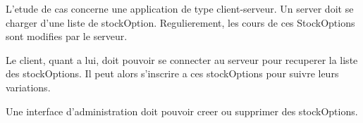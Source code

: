 L'etude de cas concerne une application de type client-serveur. Un server doit se charger d'une liste de stockOption. Regulierement, les cours de ces StockOptions sont modifies par le serveur. 

Le client, quant a lui, doit pouvoir se connecter au serveur pour recuperer la liste des stockOptions. Il peut alors s'inscrire a ces stockOptions pour suivre leurs variations. 

Une interface d'administration doit pouvoir creer ou supprimer des stockOptions.